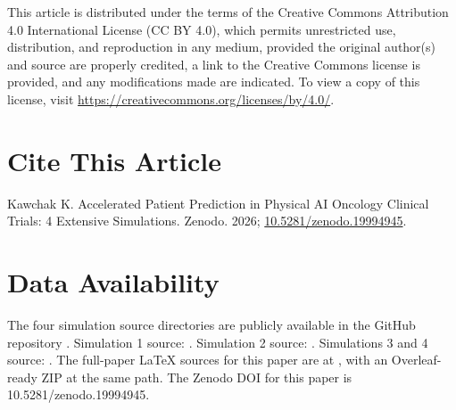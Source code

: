 This article is distributed under the terms of the Creative Commons
Attribution 4.0 International License (CC BY 4.0), which permits
unrestricted use, distribution, and reproduction in any medium,
provided the original author(s) and source are properly credited, a
link to the Creative Commons license is provided, and any
modifications made are indicated. To view a copy of this license,
visit \url{https://creativecommons.org/licenses/by/4.0/}.

{}
\section*{Cite This Article}
\label{sec:cite}

Kawchak K. Accelerated Patient Prediction in Physical AI Oncology Clinical Trials: 4 Extensive Simulations. Zenodo. 2026;
\href{https://doi.org/10.5281/zenodo.19994945}{10.5281/zenodo.19994945}.

{}
\section*{Data Availability}
\label{sec:data}

The four simulation source directories are publicly available in the
 GitHub repository
\cite{main-repo}. Simulation 1 source: 
\cite{kawchak_2026_19176370, kawchak_2026_19244918}. Simulation 2
source:  \cite{kawchak_2026_19119939,
kawchak_2026_18810541}. Simulations 3 and 4 source:
 \cite{kawchak_2026_19396256}. The
full-paper LaTeX sources for this paper are at
, with an
Overleaf-ready ZIP at the same path. The Zenodo DOI for this paper is
10.5281/zenodo.19994945.












